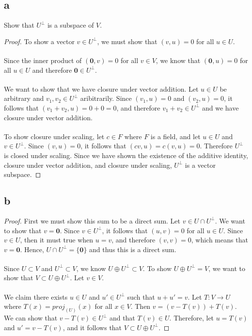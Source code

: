 \documentclass{article}
\begin{document}
\subsection*{a}
Show that $U^{\perp}$ is a subspace of $V$. 
\begin{proof}
To show a vector $v \in U^{\perp}$, we must show that $(v, u) = 0$ for all $u \in U$.\\\\
Since the inner product of $(\mathbf{0}, v) =0$ for all $v \in V$, we know that $(\mathbf{0}, u) = 0$ for all $u \in U$ and therefore $\mathbf{0} \in U^{\perp}$.
 \\\\ We want to show that we have closure under vector addition. Let $u \in U$ be arbitrary and $v_1, v_2 \in U^{\perp}$ aribitrarily. Since $(v_1, u) = 0$ and $(v_2, u) = 0$, it follows that $(v_1 + v_2, u) = 0 + 0 = 0$, and therefore $v_1 + v_2 \in U^{\perp}$ and we have closure under vector addition.\\\\  To show closure under scaling, let $c \in F$ where $F$ is a field, and let $u \in U$ and $v \in U^{\perp}$. Since $(v,u) = 0$, it follows that $(cv,u) = c(v,u) = 0$. Therefore $U^{\perp}$ is closed under scaling. Since we have shown the existence of the additive identity, closure under vector addition, and closure under scaling, $U^{\perp}$ is a vector subspace.

\end{proof}
\subsection*{b}
\begin{proof}
First we must show this sum to be a direct sum. Let $v \in U \cap U^{\perp}$. We want to show that $v = \mathbf{0}$. Since $v \in U^{\perp}$, it follows that $(u, v) = 0$ for all $u \in U$. Since $v \in U$, then it must true when $u = v$, and therefore $(v,v) = 0$, which means that $v = \mathbf{0}$. Hence, $U \cap U^{\perp} = \{ \mathbf{0} \}$ and thus this is a direct sum. \\\\
Since $U \subset V$ and $U^{\perp} \subset V$, we know $U \oplus U^{\perp} \subset V$. To show $U \oplus U^{\perp} = V$, we want to show that $V \subset U \oplus U^{\perp}$. Let $v \in V$. \\\\ 
We claim there exists $u \in U$ and $u' \in U^{\perp}$ such that $u + u' = v$. Let $T: V \rightarrow U$ where $T(x) = proj_{(U)}(x)$ for all $x \in V$. Then $v =( v - T(v) )+ T(v)$.  We can show that $v-T(v) \in U^{\perp}$ and that $T(v) \in U$. Therefore, let $u = T(v)$ and $u' = v - T(v)$, and it follows that $V \subset U \oplus U^{\perp}$.

\end{proof}
\end{document}
